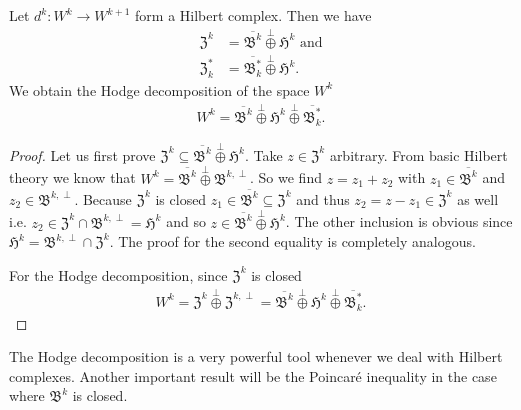 \documentclass[../master_thesis.tex]{subfiles}
\begin{document}
\begin{theorem}\label{thm:hodge_decomposition}
    Let $d^k: W^k \rightarrow W^{k+1}$ form a Hilbert complex. 
    Then we have
    \begin{align*}
        \mathfrak{Z}^k &= \overline{\mathfrak{B}^k} \stackrel{\perp}{\oplus}
            \mathfrak{H}^k \text{ and}
        \\ \mathfrak{Z}^*_k &= 
            \overline{\mathfrak{B}^*_k} \stackrel{\perp}{\oplus}
            \mathfrak{H}^k.
    \end{align*}
    We obtain the Hodge decomposition of the space $W^k$
    \begin{align*}
        W^k = \overline{\mathfrak{B}^k} \stackrel{\perp}{\oplus}
            \mathfrak{H}^k \stackrel{\perp}{\oplus} \overline{\mathfrak{B}^*_k}.
    \end{align*}
\end{theorem}
\begin{proof}
    Let us first prove $\mathfrak{Z}^k \subseteq 
    \overline{\mathfrak{B}^k} \stackrel{\perp}{\oplus} \mathfrak{H}^k$.
    Take $z \in \mathfrak{Z}^k$ arbitrary. 
    From basic Hilbert theory we know that 
    $W^k = \overline{\mathfrak{B}^k} \stackrel{\perp}{\oplus} 
    \mathfrak{B}^{k,\perp}$. So we find $z = z_1 + z_2$ with
    $z_1 \in \overline{\mathfrak{B}^k}$ and $z_2 \in 
    \mathfrak{B}^{k,\perp}$. 
    Because $\mathfrak{Z}^k$ is closed 
    $z_1 \in \overline{\mathfrak{B}^k} \subseteq \mathfrak{Z}^k$ 
    and thus $z_2 = z - z_1 \in \mathfrak{Z}^k$ as well i.e. $z_2 \in \mathfrak{Z}^k 
    \cap \mathfrak{B}^{k,\perp} = \mathfrak{H}^k$ and so 
    $z \in \overline{\mathfrak{B}^k} \stackrel{\perp}{\oplus}
    \mathfrak{H}^k$. The other inclusion is obvious since 
    $\mathfrak{H}^k = \mathfrak{B}^{k,\perp} \cap \mathfrak{Z}^k$.
    The proof for the second equality is completely analogous. 

    For the Hodge decomposition, since $\mathfrak{Z}^k$ is closed 
    \begin{align*}
        W^k = \mathfrak{Z}^k \stackrel{\perp}{\oplus} \mathfrak{Z}^{k,\perp}
        =  \overline{\mathfrak{B}^k} \stackrel{\perp}{\oplus}
            \mathfrak{H}^k \stackrel{\perp}{\oplus} \overline{\mathfrak{B}^*_k}.
    \end{align*}
\end{proof}
The Hodge decomposition is a very powerful tool whenever we deal with Hilbert
complexes. Another important result will be the Poincaré inequality 
in the case where $\mathfrak{B}^k$ is closed.
\end{document}
